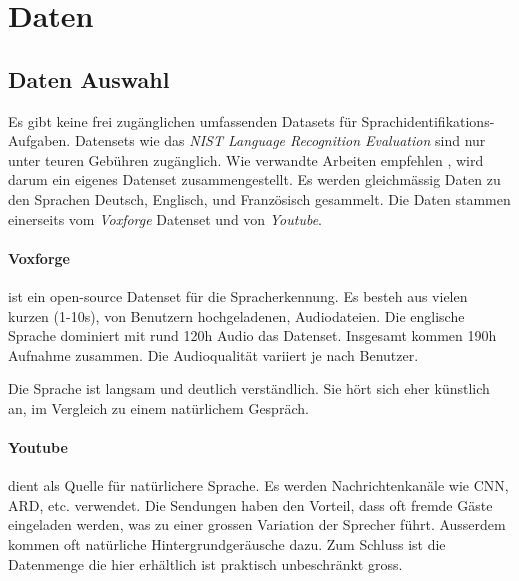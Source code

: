 \section{Daten}


\subsection{Daten Auswahl}
Es gibt keine frei zugänglichen umfassenden Datasets für Sprachidentifikations-Aufgaben. Datensets wie das \textit{NIST Language Recognition Evaluation}\cite{nist} sind nur unter teuren Gebühren zugänglich. Wie verwandte Arbeiten empfehlen \cite{iLID}, wird darum ein eigenes Datenset zusammengestellt. Es werden gleichmässig Daten zu den Sprachen Deutsch, Englisch, und Französisch gesammelt. Die Daten stammen einerseits vom \textit{Voxforge}\cite{voxforge} Datenset und von \textit{Youtube}\cite{youtube}.

\paragraph{Voxforge} ist ein open-source Datenset für die Spracherkennung. Es besteh aus vielen kurzen (1-10s), von Benutzern hochgeladenen, Audiodateien. Die englische Sprache dominiert mit rund 120h Audio das Datenset. Insgesamt kommen 190h Aufnahme zusammen. Die Audioqualität variiert je nach Benutzer.

Die Sprache ist langsam und deutlich verständlich. Sie hört sich eher künstlich an, im Vergleich zu einem natürlichem Gespräch.

\paragraph{Youtube}dient als Quelle für natürlichere Sprache. Es werden Nachrichtenkanäle wie CNN, ARD, etc. verwendet. Die Sendungen haben den Vorteil, dass oft fremde Gäste eingeladen werden, was zu einer grossen Variation der Sprecher führt. Ausserdem kommen oft natürliche Hintergrundgeräusche dazu. Zum Schluss ist die Datenmenge die hier erhältlich ist praktisch unbeschränkt gross.

